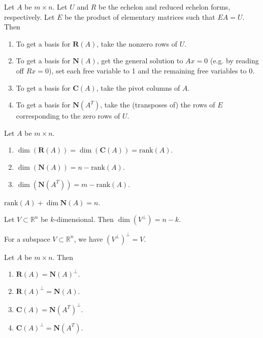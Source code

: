 \documentclass[12pt]{article}
\begin{document}
\begin{theorem}
	Let $A$ be $m\times n$. Let $U$ and $R$ be the echelon and reduced echelon forms, respectively. Let $E$ be the product of elementary matrices such that $EA=U$. Then 
	\begin{enumerate}
		\item To get a basis for $\mathbf{R}(A)$, take the nonzero rows of $U$.
		\item To get a basis for $\mathbf{N}(A)$, get the general solution to $Ax=0$ (e.g. by reading off $Rx=0$), set each free variable to 1 and the remaining free variables to 0. 
		\item To get a basis for $\mathbf{C}(A)$, take the pivot columns of $A$.
		\item To get a basis for $\mathbf{N}(A^T)$, take the (transposes of) the rows of $E$ corresponding to the zero rows of $U$.
	\end{enumerate}
\end{theorem}

\begin{theorem}
	Let $A$ be $m\times n$. 
	\begin{enumerate}
		\item $\dim(\mathbf{R}(A))=\dim(\mathbf{C}(A))=\text{rank}(A)$.
		\item $\dim(\mathbf{N}(A))=n-\text{rank}(A)$.
		\item $\dim(\mathbf{N}(A^T))=m-\text{rank}(A)$.
	\end{enumerate}
\end{theorem}

\begin{corollary}
	$\text{rank}(A) + \dim{\mathbf{N}(A)} = n$.
\end{corollary}

\begin{proposition}
	Let $V\subset\mathbb{R}^n$ be $k$-dimensional. Then $\dim(V^\perp)=n-k$.
\end{proposition}

\begin{proposition}
	For a subspace $V\subset\mathbb{R}^n$, we have $(V^\perp)^\perp=V$.
\end{proposition}

\begin{theorem}
	Let $A$ be $m\times n$. Then 
	\begin{enumerate}
		\item $\mathbf{R}(A) = \mathbf{N}(A)^\perp$.
		\item $\mathbf{R}(A)^\perp = \mathbf{N}(A)$.
		\item $\mathbf{C}(A) = \mathbf{N}(A^T)^\perp$.
		\item $\mathbf{C}(A)^\perp = \mathbf{N}(A^T)$.
	\end{enumerate}
\end{theorem}
\end{document}
